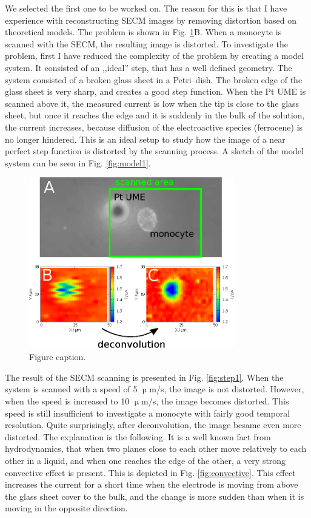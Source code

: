 \documentclass[a4paper, 11pt, oneside, bibliography=totoc]{article}
\begin{document}
We selected the first one to be worked on. The reason for this is that I have experience with reconstructing SECM images by removing distortion based on theoretical models. The problem is shown in Fig. \ref{fig:deconv}B. When a monocyte is scanned with the SECM, the resulting image is distorted. To investigate the problem, first I have reduced the complexity of the problem by creating a model system. It consisted of an ,,ideal'' step, that has a well defined geometry. The system consisted of a broken glass sheet in a Petri--dish. The broken edge of the glass sheet is very sharp, and creates a good step function. When the Pt UME is scanned above it, the measured current is low when the tip is close to the glass sheet, but once it reaches the edge and it is suddenly in the bulk of the solution, the current increases, because diffusion of the electroactive species (ferrocene) is no longer hindered. This is an ideal setup to study how the image of a near perfect step function is distorted by the scanning process. A sketch of the model system can be seen in Fig. \ref{fig:model1}.

\begin{figure}
\centering
\includegraphics[width=0.8\textwidth]{deconv.eps}
\caption{Figure caption.}
\label{fig:deconv}
\end{figure} 

The result of the SECM scanning is presented in Fig. \ref{fig:step1}. When the system is scanned with a speed of 5 $\upmu$m/s, the image is not distorted. However, when the speed is increased to 10 $\upmu$m/s, the image becomes distorted. This speed is still insufficient to investigate a monocyte with fairly good temporal resolution. Quite surprisingly, after deconvolution, the image besame even more distorted. The explanation is the following. It is a well known fact from hydrodynamics, that when two planes close to each other move relatively to each other in a liquid, and when one reaches the edge of the other, a very strong convective effect is present. This is depicted in Fig. \ref{fig:convective}. This effect increases the current for a short time when the electrode is moving from above the glass sheet cover to the bulk, and the change is more sudden than when it is moving in the opposite direction.
\end{document}
